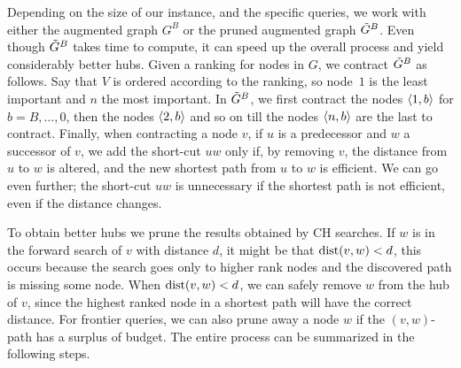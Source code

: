Depending on the size of our instance, and the specific queries, we work with either the augmented graph $G^B$ or the pruned augmented graph $\tilde G^B$.
Even though $\tilde G^B$ takes time to compute, it can speed up the overall process and yield considerably better hubs. 
Given a ranking for nodes in $G$, we contract $\tilde G^B$ as follows.
Say that $V$ is ordered according to the ranking, so node~$1$ is the least important and $n$ the most important.
In $\tilde G^B$, we first contract the nodes $\langle1,b\rangle$ for $b=B,\ldots,0$, then the nodes $\langle2,b\rangle$ and so on till the nodes $\langle n,b\rangle$ are the last to contract. 
Finally, when contracting a node $v$, if $u$ is a predecessor and $w$ a successor of $v$, we add the short-cut $uw$ only if, by removing $v$, the distance from $u$ to $w$ is altered, and the new shortest path from $u$ to $w$ is efficient.
We can go even further; the short-cut $uw$ is unnecessary if the shortest path is not efficient, even if the distance changes.

To obtain better hubs we prune the results obtained by CH searches.
If $w$ is in the forward search of $v$ with distance $d$, it might be that $\mbox{dist}(v,w)<d$, this occurs because the search goes only to higher rank nodes and the discovered path is missing some node.
When $\mbox{dist}(v,w)<d$, we can safely remove $w$ from the hub of $v$, since the highest ranked node in a shortest path will have the correct distance.
For frontier queries, we can also prune away a node $w$ if the $(v,w)$-path has a surplus of budget.
The entire process can be summarized in the following steps.

